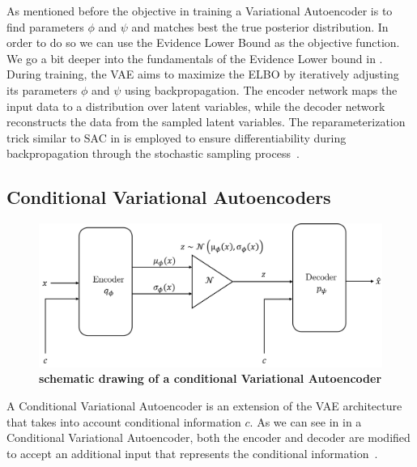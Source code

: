 As mentioned before the objective in training a Variational Autoencoder is to find parameters $\phi$ and $\psi$ and matches best the true posterior distribution. In order to do so we can use the Evidence Lower Bound as the objective function. We go a bit deeper into the fundamentals of the Evidence Lower bound in . \\
During training, the VAE aims to maximize the ELBO by iteratively adjusting its parameters $\phi$ and $\psi$ using backpropagation. The encoder network maps the input data to a distribution over latent variables, while the decoder network reconstructs the data from the sampled latent variables. The reparameterization trick similar to SAC in  is employed to ensure differentiability during backpropagation through the stochastic sampling process~\cite{pml2Book}.



\subsection{Conditional Variational Autoencoders}

\begin{figure}
    \begin{center}
        \includegraphics[width=0.7\linewidth]{figures/background/CVAE.png}
        \caption[Conditional Variational Autoencoder schematics]{\textbf{schematic drawing of a conditional Variational Autoencoder}}
        \label{fig:conditional-Variational_Autoencoder_schematics}
    \end{center}
\end{figure}
A Conditional Variational Autoencoder is an extension of the VAE architecture that takes into account conditional information $c$. As we can see in  in a Conditional Variational Autoencoder, both the encoder and decoder are modified to accept an additional input that represents the conditional information~\cite{CVAE}. 

